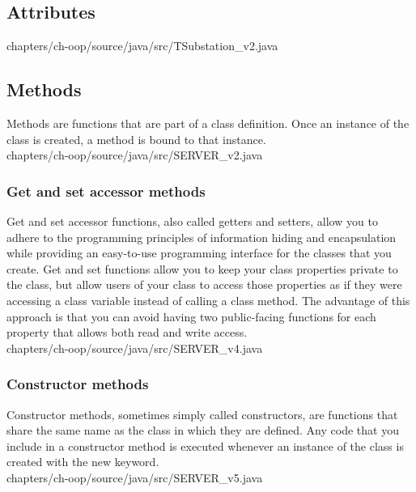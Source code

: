 \subsection{Attributes}
%	
	
	{chapters/ch-oop/source/java/src/TSubstation_v2.java}



\subsection{Methods}
Methods are functions that are part of a class 
definition. Once an instance of the class is created, 
a method is bound to that instance.\\
	
	{chapters/ch-oop/source/java/src/SERVER_v2.java}



	\subsubsection{Get and set accessor methods}
	Get and set accessor functions, also called getters 
	and setters, allow you to adhere to the programming principles of 
	information hiding and encapsulation while providing an 
	easy-to-use programming interface for the classes that you 
	create. Get and set functions allow you to keep your class 
	properties private to the class, but allow users of your class 
	to access those properties as if they were accessing a 
	class variable instead of calling a class method. 
	The advantage of this approach is that you can avoid 
	having two public-facing functions for each property 
	that allows both read and write access. \\

		
		{chapters/ch-oop/source/java/src/SERVER_v4.java}
	
	
	\subsubsection{Constructor methods}
	Constructor methods, sometimes simply called constructors, 
	are functions that share the same name as the class in 
	which they are defined. Any code that you include in 
	a constructor method is executed whenever an instance of the 
	class is created with the  new  keyword. \\

		 {chapters/ch-oop/source/java/src/SERVER_v5.java}

	
